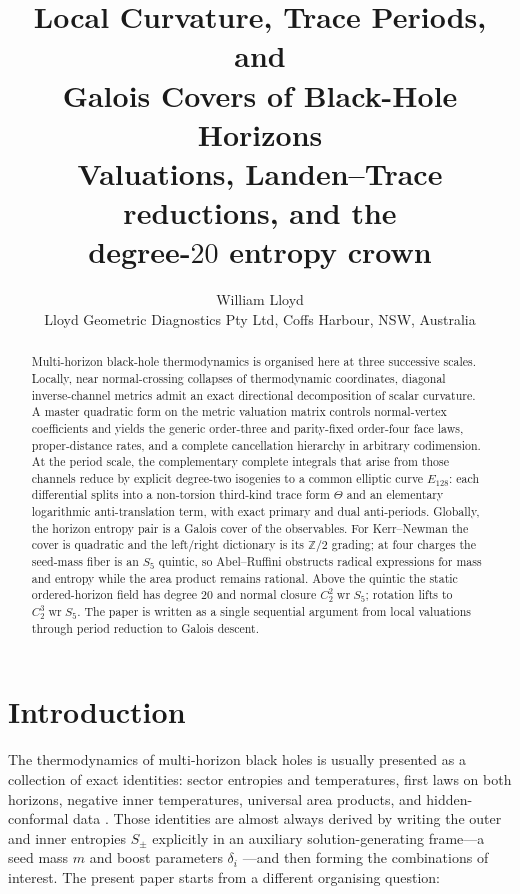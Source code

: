 \documentclass[11pt,a4paper]{article}
\title{\textbf{Local Curvature, Trace Periods, and\\
Galois Covers of Black-Hole Horizons}\\[8pt]
\large Valuations, Landen--Trace reductions, and the\\
degree-$20$ entropy crown\\[10pt]
\normalsize\fbox{PREPRINT v2.1 --- 13 July 2026}}
\author{William Lloyd\\
\small Lloyd Geometric Diagnostics Pty Ltd, Coffs Harbour, NSW, Australia}
\date{}
\theoremstyle{definition}
\theoremstyle{remark}
\newcommand{\ZZ}{\mathbb{Z}}
\newcommand{\wrp}{\mathop{\mathrm{wr}}}
\begin{document}
\maketitle

\begin{abstract}
Multi-horizon black-hole thermodynamics is organised here at three successive
scales. Locally, near normal-crossing collapses of thermodynamic coordinates,
diagonal inverse-channel metrics admit an exact directional decomposition of
scalar curvature. A master quadratic form on the metric valuation matrix
controls normal-vertex coefficients and yields the generic order-three and
parity-fixed order-four face laws, proper-distance rates, and a complete
cancellation hierarchy in arbitrary codimension. At the period scale, the
complementary complete integrals that arise from those channels reduce by
explicit degree-two isogenies to a common elliptic curve \(E_{128}\): each
differential splits into a non-torsion third-kind trace form \(\Theta\) and an
elementary logarithmic anti-translation term, with exact primary and dual
anti-periods. Globally, the horizon entropy pair is a Galois cover of the
observables. For Kerr--Newman the cover is quadratic and the left/right
dictionary is its \(\ZZ/2\) grading; at four charges the seed-mass fiber is an
\(S_5\) quintic, so Abel--Ruffini obstructs radical expressions for mass and
entropy while the area product remains rational. Above the quintic the static
ordered-horizon field has degree \(20\) and normal closure \(C_2^2\wrp S_5\);
rotation lifts to \(C_2^3\wrp S_5\). The paper is written as a single sequential
argument from local valuations through period reduction to Galois descent.
\end{abstract}

\tableofcontents
\newpage

\section{Introduction}
\label{sec:intro}

The thermodynamics of multi-horizon black holes is usually presented as a
collection of exact identities: sector entropies and temperatures, first laws
on both horizons, negative inner temperatures, universal area products, and
hidden-conformal data
\cite{CL1,CL2,CGLP2018,AH,CGP2011,CR2012,CMS,WangLiu,ChenLong4Q}. Those
identities are almost always derived by writing the outer and inner entropies
\(S_\pm\) explicitly in an auxiliary solution-generating frame---a seed mass
\(m\) and boost parameters \(\delta_i\) \cite{CY,Std4Q}---and then forming the
combinations of interest. The present paper starts from a different organising
question:
\end{document}
